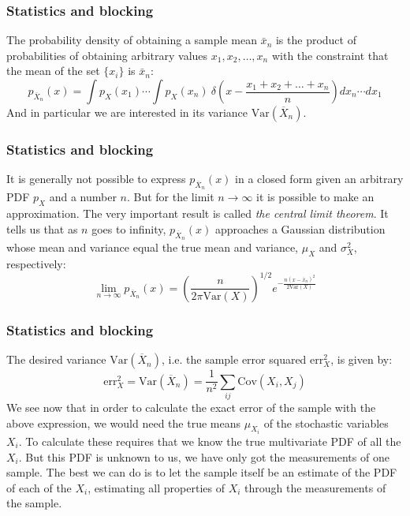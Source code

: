 \documentclass[compress]{beamer}
\newcommand{\be}{\begin{equation}}
\newcommand{\ee}{\end{equation}}
\newcommand{\bdm}{\begin{displaymath}}
\newcommand{\edm}{\end{displaymath}}
\newcommand{\cov}[0]{\mathrm{Cov}}   %
\newcommand{\var}[0]{\mathrm{Var}}   %
\newcommand{\be}{\begin{equation}}                        %
\newcommand{\ee}{\end{equation}}                          %
\begin{document}
\frame
{
  \frametitle{Statistics and blocking}
\begin{small}
{\scriptsize
The probability density of obtaining a sample mean $\bar x_n$
is the product of probabilities of obtaining arbitrary values $x_1,
x_2,\dots,x_n$ with the constraint that the mean of the set $\{x_i\}$
is $\bar x_n$:
\bdm
p_{\overline X_n}(x) = \int p_X^{\phantom X}(x_1)\cdots
\int p_X^{\phantom X}(x_n)\ 
\delta\!\left(x - \frac{x_1+x_2+\dots+x_n}{n}\right)dx_n \cdots dx_1
\edm
And in particular we are interested in its variance $\var(\overline
X_n)$.
}
\end{small}
}

\frame
{
  \frametitle{Statistics and blocking}
\begin{small}
{\scriptsize
It is generally not possible to express $p_{\overline X_n}(x)$ in a
closed form given an arbitrary PDF $p_X^{\phantom X}$ and a number
$n$. But for the limit $n\to\infty$ it is possible to make an
approximation. The very important result is called \emph{the central
  limit theorem}. It tells us that as $n$ goes to infinity,
$p_{\overline X_n}(x)$ approaches a Gaussian distribution whose mean
and variance equal the true mean and variance, $\mu_{X}^{\phantom X}$
and $\sigma_{X}^{2}$, respectively:
\be
\lim_{n\to\infty} p_{\overline X_n}(x) =
\left(\frac{n}{2\pi\var(X)}\right)^{1/2}
e^{-\frac{n(x-\bar x_n)^2}{2\var(X)}}
\label{eq:central_limit_gaussian}
\ee
}
\end{small}
}

\frame
{
  \frametitle{Statistics and blocking}
\begin{small}
{\scriptsize
The desired variance
$\var(\overline X_n)$, i.e. the sample error squared
$\mathrm{err}_X^2$, is given by:
\be
\mathrm{err}_X^2 = \var(\overline X_n) = \frac{1}{n^2}
\sum_{ij} \cov(X_i, X_j)
\label{eq:error_exact}
\ee
We see now that in order to calculate the exact error of the sample
with the above expression, we would need the true means
$\mu_{X_i}^{\phantom X}$ of the stochastic variables $X_i$. To
calculate these requires that we know the true multivariate PDF of all
the $X_i$. But this PDF is unknown to us, we have only got the measurements of
one sample. The best we can do is to let the sample itself be an
estimate of the PDF of each of the $X_i$, estimating all properties of
$X_i$ through the measurements of the sample.
}
\end{small}
}
\end{document}
